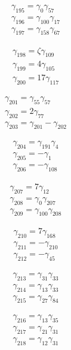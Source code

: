 \[\begin{aligned}\gamma_{195}=\gamma_{0} \gamma_{57}\\ \gamma_{196}=\gamma_{100} \gamma_{17}\\ \gamma_{197}=\gamma_{158} \gamma_{67}\end{aligned}\]

\[\begin{aligned}\gamma_{198}=\zeta  \gamma_{109}\\ \gamma_{199}=4 \gamma_{105}\\ \gamma_{200}=17 \gamma_{117}\end{aligned}\]

\[\begin{aligned}\gamma_{201}=\gamma_{55} \gamma_{57}\\ \gamma_{202}=2 \gamma_{77}\\ \gamma_{203}=\gamma_{201} - \gamma_{202}\end{aligned}\]

\[\begin{aligned}\gamma_{204}=\gamma_{191} \gamma_{4}\\ \gamma_{205}=- \gamma_{1}\\ \gamma_{206}=- \gamma_{108}\end{aligned}\]

\[\begin{aligned}\gamma_{207}=7 \gamma_{12}\\ \gamma_{208}=\gamma_{0} \gamma_{207}\\ \gamma_{209}=\gamma_{100} \gamma_{208}\end{aligned}\]

\[\begin{aligned}\gamma_{210}=7 \gamma_{168}\\ \gamma_{211}=- \gamma_{210}\\ \gamma_{212}=- \gamma_{45}\end{aligned}\]

\[\begin{aligned}\gamma_{213}=\gamma_{31} \gamma_{33}\\ \gamma_{214}=\gamma_{13} \gamma_{33}\\ \gamma_{215}=\gamma_{27} \gamma_{84}\end{aligned}\]

\[\begin{aligned}\gamma_{216}=\gamma_{13} \gamma_{35}\\ \gamma_{217}=\gamma_{21} \gamma_{31}\\ \gamma_{218}=\gamma_{12} \gamma_{31}\end{aligned}\]

